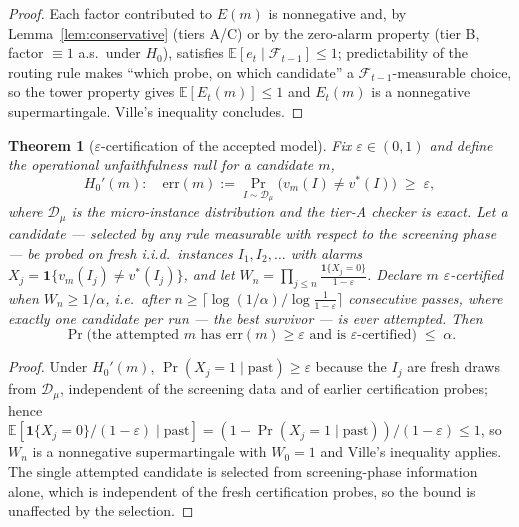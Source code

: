 \documentclass[pdflatex,sn-mathphys-num]{sn-jnl}
\theoremstyle{thmstyleone}
\newtheorem{theorem}{Theorem}
\theoremstyle{thmstyletwo}
\newcommand{\Eproc}{E}
\newcommand{\Filt}{\mathcal{F}}
\newcommand{\HO}{H_0}
\begin{document}
\begin{proof}
Each factor contributed to $\Eproc(m)$ is nonnegative and, by
Lemma~\ref{lem:conservative} (tiers A/C) or by the zero-alarm
property (tier B, factor $\equiv 1$ a.s.\ under $\HO$), satisfies
$\mathbb{E}[e_t \mid \Filt_{t-1}] \le 1$; predictability of the
routing rule makes ``which probe, on which candidate'' a
$\Filt_{t-1}$-measurable choice, so the tower property gives
$\mathbb{E}[\Eproc_t(m)] \le 1$ and $\Eproc_t(m)$ is a nonnegative
supermartingale. Ville's inequality \cite{ville1939etude} concludes.
\end{proof}

\begin{theorem}[$\varepsilon$-certification of the accepted
model]\label{thm:cert}
Fix $\varepsilon \in (0,1)$ and define the operational unfaithfulness
null for a candidate $m$,
\[
\HO'(m):\quad
\mathrm{err}(m) := \Pr_{I \sim \mathcal{D}_{\mu}}
\bigl(v_m(I) \ne v^\ast(I)\bigr) \;\ge\; \varepsilon,
\]
where $\mathcal{D}_{\mu}$ is the micro-instance distribution and the
tier-A checker is exact. Let a candidate --- selected by \emph{any}
rule measurable with respect to the screening phase --- be probed on
fresh i.i.d.\ instances $I_1, I_2, \dots$ with alarms
$X_j = \mathbf{1}\{v_m(I_j) \ne v^\ast(I_j)\}$, and let
$W_n = \prod_{j \le n} \frac{\mathbf{1}\{X_j = 0\}}{1 - \varepsilon}$.
Declare $m$ \emph{$\varepsilon$-certified} when
$W_n \ge 1/\alpha$, i.e.\ after
$n \ge \lceil \log(1/\alpha) / \log\frac{1}{1-\varepsilon} \rceil$
consecutive passes, where \emph{exactly one} candidate per run --- the
best survivor --- is ever attempted. Then
\[
\Pr\bigl(\text{the attempted } m \text{ has } \mathrm{err}(m) \ge
\varepsilon \text{ and is } \varepsilon\text{-certified}\bigr)
\;\le\; \alpha .
\]
\end{theorem}

\begin{proof}
Under $\HO'(m)$, $\Pr(X_j = 1 \mid \text{past}) \ge \varepsilon$
because the $I_j$ are fresh draws from $\mathcal{D}_{\mu}$,
independent of the screening data and of earlier certification
probes; hence
$\mathbb{E}[\mathbf{1}\{X_j = 0\}/(1-\varepsilon) \mid \text{past}]
= (1 - \Pr(X_j = 1 \mid \text{past}))/(1-\varepsilon) \le 1$, so
$W_n$ is a nonnegative supermartingale with $W_0 = 1$ and Ville's
inequality applies. The single attempted candidate is selected from
screening-phase information alone, which is independent of the fresh
certification probes, so the bound is unaffected by the selection.
\end{proof}
\end{document}
